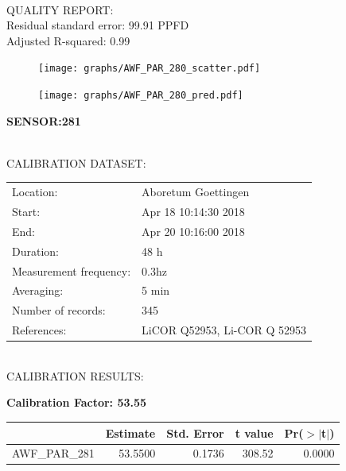 \documentclass[oneside]{report}
\begin{document}
\hrulefill\\
QUALITY REPORT:\\
Residual standard error: 99.91 PPFD\\
Adjusted R-squared: 0.99



\begin{figure}[H]
  \centering
  \texttt{[image: graphs/AWF\_PAR\_280\_scatter.pdf]}
\end{figure}




\begin{figure}[H]
  \centering
  \texttt{[image: graphs/AWF\_PAR\_280\_pred.pdf]}
\end{figure}

\pagebreak


\begin{center}
\large{\textbf{SENSOR:281}}\\
\end{center}

\hrulefill\\
CALIBRATION DATASET:\\
\begin{table}[h!]
  \centering
  \label{tab:table1}
  \begin{tabular}{ll}
    Location: & Aboretum Goettingen\\ 
    
    
    Start:  & Apr 18 10:14:30 2018 \\
    End:   & Apr 20 10:16:00 2018\\ 
    Duration: & 48 h\\
    Measurement frequency: & 0.3hz\\
    Averaging:  &5 min\\
    Number of records: & 345 \\
    References: & LiCOR Q52953, Li-COR Q 52953 \\
  \end{tabular}
\end{table}

\hrulefill\\
CALIBRATION RESULTS:\\


\begin{center}
\textbf{\large{Calibration Factor: 53.55}}\\
\end{center}
\begin{table}[ht]
\centering
\begin{tabular}{rrrrr}
  \hline
 & Estimate & Std. Error & t value & Pr($>$$|$t$|$) \\ 
  \hline
AWF\_PAR\_281 & 53.5500 & 0.1736 & 308.52 & 0.0000 \\ 
   \hline
\end{tabular}
\end{table}
\end{document}
